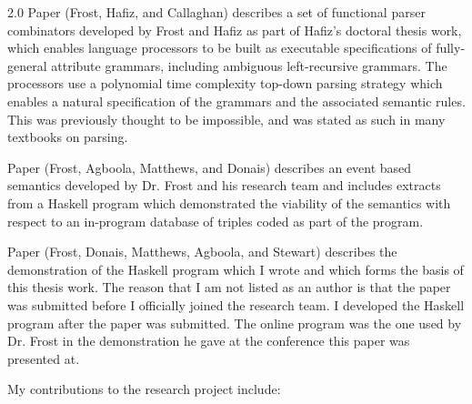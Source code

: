 \documentclass[fleqn, oneside, 12pt]{book}
\theoremstyle{definitionsty}
\newcommand{\uwindoublespacelen}{2.0}
\newenvironment{uwindoublespaceenv}%
{\begin{spacing}{\uwindoublespacelen}}%
	{\end{spacing}}
\begin{document}
\cite{frosthafiz2008} 

\cite{frostagboola2014} 

\cite{frost2014demonstration} 

\begin{uwindoublespaceenv}
	Paper \cite{frosthafiz2008} (Frost, Hafiz, and Callaghan) describes a set of functional parser combinators developed by Frost and Hafiz as part of Hafiz's doctoral thesis work, which enables language processors to be built as executable specifications of fully-general attribute grammars, including ambiguous left-recursive grammars.  The processors use a polynomial time complexity top-down parsing strategy which enables a natural specification of the grammars and the associated semantic rules.  This was previously thought to be impossible, and was stated as such in many textbooks on parsing.
	
	Paper \cite{frostagboola2014} (Frost, Agboola, Matthews, and Donais) describes an event based semantics developed by Dr. Frost and his research team and includes extracts from a Haskell program which demonstrated the viability of the semantics with respect to an in-program database of triples coded as part of the program.
	
	Paper \cite{frost2014demonstration} (Frost, Donais, Matthews, Agboola, and Stewart) describes the demonstration of the Haskell program which I wrote and which forms the basis of this thesis work.  The reason that I am not listed as an author is that the paper was submitted before I officially joined the research team.  I developed the Haskell program after the paper was submitted.  The online program was the one used by Dr. Frost in the demonstration he gave at the conference this paper was presented at.
	
	My contributions to the research project include:
	

\end{uwindoublespaceenv}
\end{document}
